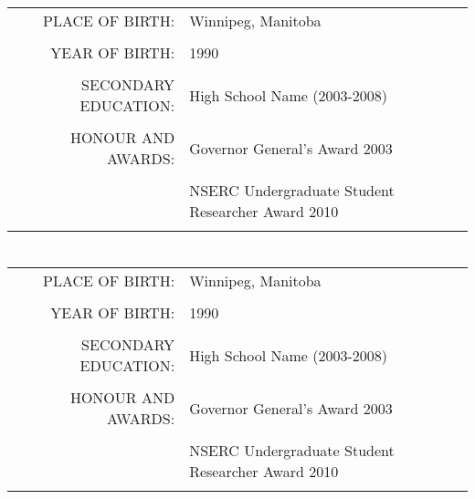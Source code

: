 \section*{\centering \StudentNameE}
\begin{table}[htdp]
\begin{center}
\begin{tabular}{rl}
	PLACE OF BIRTH: 
		& Winnipeg, Manitoba\\ \\
	YEAR OF BIRTH: 
		& 1990 \\ \\
	SECONDARY EDUCATION: 
		& High School Name (2003-2008) \\ \\
	HONOUR AND AWARDS: 
		& Governor General's Award 2003 \\ \\
		& NSERC Undergraduate Student Researcher Award 2010 \\ \\
\end{tabular}
\end{center}
\end{table}
\newpage

\section*{\centering \StudentNameF}
\begin{table}[htdp]
\begin{center}
\begin{tabular}{rl}
	PLACE OF BIRTH: 
		& Winnipeg, Manitoba\\ \\
	YEAR OF BIRTH: 
		& 1990 \\ \\
	SECONDARY EDUCATION: 
		& High School Name (2003-2008) \\ \\
	HONOUR AND AWARDS: 
		& Governor General's Award 2003 \\ \\
		& NSERC Undergraduate Student Researcher Award 2010 \\ \\
\end{tabular}
\end{center}
\end{table}
\newpage
